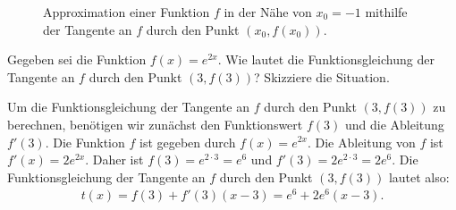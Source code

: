 \begin{figure}[H]
  \begin{center}
  \end{center}
  \caption{Approximation einer Funktion $f$ in der Nähe von $x_0 = -1$ mithilfe der Tangente an $f$ durch den Punkt $(x_0, f(x_0))$.}
  \label{fig:Taylor1}
\end{figure}

\begin{myexercise}
  Gegeben sei die Funktion $f(x) = e^{2x}$. 
  Wie lautet die Funktionsgleichung der Tangente an $f$ durch den Punkt $(3, f(3))$? 
  Skizziere die Situation.
  \begin{myanswer}
    Um die Funktionsgleichung der Tangente an $f$ durch den Punkt $(3, f(3))$ zu berechnen, benötigen wir zunächst den Funktionswert $f(3)$ und die Ableitung $f'(3)$. Die Funktion $f$ ist gegeben durch $f(x) = e^{2x}$. Die Ableitung von $f$ ist $f'(x) = 2e^{2x}$.
    Daher ist $f(3) = e^{2 \cdot 3} = e^{6}$ und $f'(3) = 2e^{2 \cdot 3} = 2e^{6}$.
    Die Funktionsgleichung der Tangente an $f$ durch den Punkt $(3, f(3))$ lautet also:
    \begin{align*}
      t(x) = f(3) + f'(3)(x-3)= e^{6} + 2e^{6}(x-3).
    \end{align*}
  \end{myanswer}
\end{myexercise}

